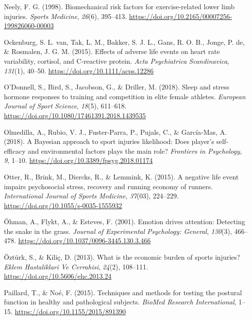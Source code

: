 \documentclass[man,floatsintext]{apa6}
\begin{document}
\leavevmode\hypertarget{ref-Neely1998}{}%
Neely, F. G. (1998). Biomechanical risk factors for exercise-related lower limb injuries. \emph{Sports Medicine}, \emph{26}(6), 395--413. \url{https://doi.org/10.2165/00007256-199826060-00003}

\leavevmode\hypertarget{ref-VanOckenburg2015a}{}%
Ockenburg, S. L. van, Tak, L. M., Bakker, S. J. L., Gans, R. O. B., Jonge, P. de, \& Rosmalen, J. G. M. (2015). Effects of adverse life events on heart rate variability, cortisol, and C-reactive protein. \emph{Acta Psychiatrica Scandinavica}, \emph{131}(1), 40--50. \url{https://doi.org/10.1111/acps.12286}

\leavevmode\hypertarget{ref-ODonnell2018a}{}%
O'Donnell, S., Bird, S., Jacobson, G., \& Driller, M. (2018). Sleep and stress hormone responses to training and competition in elite female athletes. \emph{European Journal of Sport Science}, \emph{18}(5), 611--618. \url{https://doi.org/10.1080/17461391.2018.1439535}

\leavevmode\hypertarget{ref-Olmedilla2018}{}%
Olmedilla, A., Rubio, V. J., Fuster-Parra, P., Pujals, C., \& García-Mas, A. (2018). A Bayesian approach to sport injuries likelihood: Does player's self-efficacy and environmental factors plays the main role? \emph{Frontiers in Psychology}, \emph{9}, 1--10. \url{https://doi.org/10.3389/fpsyg.2018.01174}

\leavevmode\hypertarget{ref-Otter2015}{}%
Otter, R., Brink, M., Diercks, R., \& Lemmink, K. (2015). A negative life event impairs psychosocial stress, recovery and running economy of runners. \emph{International Journal of Sports Medicine}, \emph{37}(03), 224--229. \url{https://doi.org/10.1055/s-0035-1555932}

\leavevmode\hypertarget{ref-Ohman2001}{}%
Öhman, A., Flykt, A., \& Esteves, F. (2001). Emotion drives attention: Detecting the snake in the grass. \emph{Journal of Experimental Psychology: General}, \emph{130}(3), 466--478. \url{https://doi.org/10.1037/0096-3445.130.3.466}

\leavevmode\hypertarget{ref-Ozturk2013}{}%
Öztürk, S., \& Kiliç, D. (2013). What is the economic burden of sports injuries? \emph{Eklem Hastaliklari Ve Cerrahisi}, \emph{24}(2), 108--111. \url{https://doi.org/10.5606/ehc.2013.24}

\leavevmode\hypertarget{ref-Paillard2015}{}%
Paillard, T., \& Noé, F. (2015). Techniques and methods for testing the postural function in healthy and pathological subjects. \emph{BioMed Research International}, 1--15. \url{https://doi.org/10.1155/2015/891390}
\end{document}
